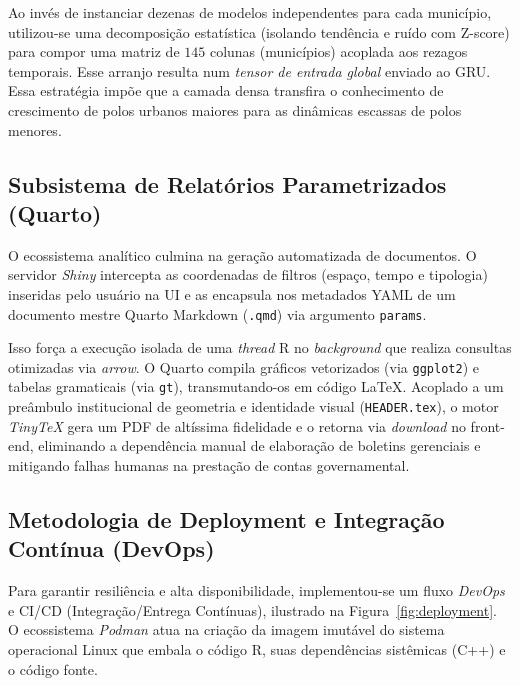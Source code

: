 \documentclass[12pt]{article}
\begin{document}
Ao invés de instanciar dezenas de modelos independentes para cada município, utilizou-se uma decomposição estatística (isolando tendência e ruído com Z-score) para compor uma matriz de $145$ colunas (municípios) acoplada aos rezagos temporais. Esse arranjo resulta num \textit{tensor de entrada global} enviado ao GRU. Essa estratégia impõe que a camada densa transfira o conhecimento de crescimento de polos urbanos maiores para as dinâmicas escassas de polos menores.


\subsection{Subsistema de Relatórios Parametrizados (Quarto)}

O ecossistema analítico culmina na geração automatizada de documentos. O servidor \textit{Shiny} intercepta as coordenadas de filtros (espaço, tempo e tipologia) inseridas pelo usuário na UI e as encapsula nos metadados YAML de um documento mestre Quarto Markdown (\texttt{.qmd}) via argumento \texttt{params}. 

Isso força a execução isolada de uma \textit{thread} R no \textit{background} que realiza consultas otimizadas via \textit{arrow}. O Quarto compila gráficos vetorizados (via \texttt{ggplot2}) e tabelas gramaticais (via \texttt{gt}), transmutando-os em código \LaTeX{}. Acoplado a um preâmbulo institucional de geometria e identidade visual (\texttt{HEADER.tex}), o motor \textit{TinyTeX} gera um PDF de altíssima fidelidade e o retorna via \textit{download} no front-end, eliminando a dependência manual de elaboração de boletins gerenciais e mitigando falhas humanas na prestação de contas governamental.

\subsection{Metodologia de Deployment e Integração Contínua (DevOps)}

Para garantir resiliência e alta disponibilidade, implementou-se um fluxo \textit{DevOps} e CI/CD (Integração/Entrega Contínuas), ilustrado na Figura~\ref{fig:deployment}. O ecossistema \textit{Podman} \cite{podman2026} atua na criação da imagem imutável do sistema operacional Linux que embala o código R, suas dependências sistêmicas (C++) e o código fonte. 
\end{document}

